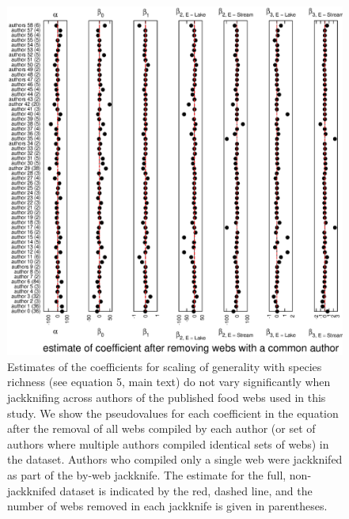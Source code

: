 \documentclass[12pt]{article}
\begin{document}
    \begin{figure}[!h]
    \centerline{\includegraphics*[height=.75\textheight]{Figures/Jackknife/Gen_author.eps}}
    \caption{Estimates of the coefficients for scaling of generality with species richness
    (see equation 5, main text) do not vary significantly
    when jackknifing across authors of the published food webs used in this study. 
    We show the pseudovalues for each coefficient
    in the equation after the removal of all webs compiled by each author (or set of authors where
    multiple authors compiled identical sets of webs) in the dataset. Authors
    who compiled only a single web were jackknifed as part of the by-web jackknife.
    The estimate for the full, non-jackknifed dataset is indicated by the red, dashed line, and
    the number of webs removed in each jackknife is given in parentheses.}
    \label{Gen_auth}
    \end{figure}

  \newpage
\end{document}
